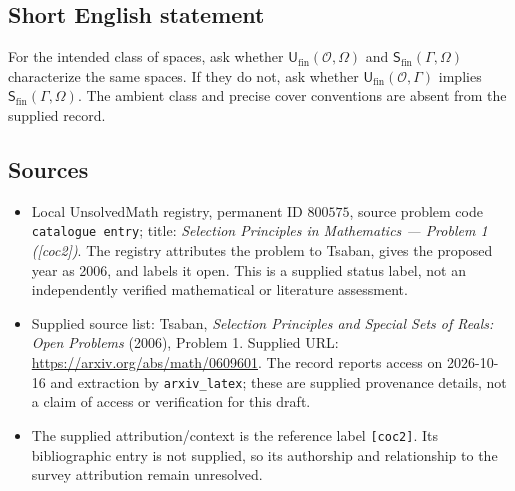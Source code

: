 \documentclass[11pt]{article}
\begin{document}
\subsection{Short English statement}
For the intended class of spaces, ask whether \(\mathsf U_{\mathrm{fin}}(\mathcal O,\Omega)\) and \(\mathsf S_{\mathrm{fin}}(\Gamma,\Omega)\) characterize the same spaces. If they do not, ask whether \(\mathsf U_{\mathrm{fin}}(\mathcal O,\Gamma)\) implies \(\mathsf S_{\mathrm{fin}}(\Gamma,\Omega)\). The ambient class and precise cover conventions are absent from the supplied record.
\subsection{Sources}
\begin{itemize}
\item Local UnsolvedMath registry, permanent ID \(800575\), source problem code \texttt{catalogue entry}; title: \emph{Selection Principles in Mathematics --- Problem 1 ([coc2])}. The registry attributes the problem to Tsaban, gives the proposed year as 2006, and labels it open. This is a supplied status label, not an independently verified mathematical or literature assessment.
\item Supplied source list: Tsaban, \emph{Selection Principles and Special Sets of Reals: Open Problems} (2006), Problem 1. Supplied URL: \url{https://arxiv.org/abs/math/0609601}. The record reports access on 2026-10-16 and extraction by \texttt{arxiv\_latex}; these are supplied provenance details, not a claim of access or verification for this draft.
\item The supplied attribution/context is the reference label \texttt{[coc2]}. Its bibliographic entry is not supplied, so its authorship and relationship to the survey attribution remain unresolved.
\end{itemize}
\end{document}
